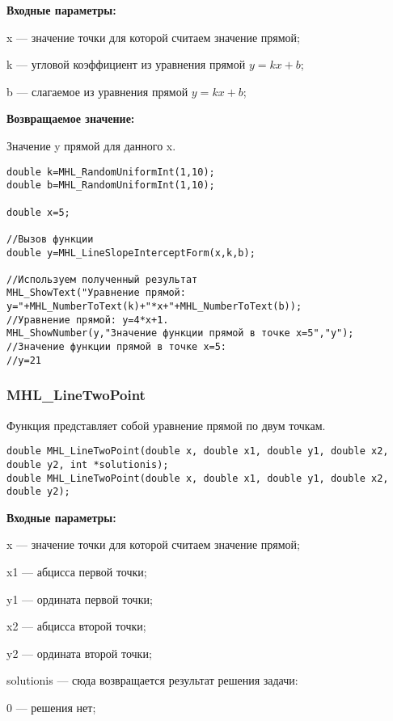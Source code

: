 \documentclass[a4paper,12pt]{article}
\begin{document}
\textbf{Входные параметры:}  
 
x --- значение точки для которой считаем значение прямой;
 
k --- угловой коэффициент из уравнения прямой $y=kx+b$;
 
b --- слагаемое из уравнения прямой $y=kx+b$; 

\textbf{Возвращаемое значение:}

Значение y прямой для данного x.


\begin{lstlisting}[label=code_use_MHL_LineSlopeInterceptForm,caption=Пример использования]
double k=MHL_RandomUniformInt(1,10);
double b=MHL_RandomUniformInt(1,10);

double x=5;

//Вызов функции
double y=MHL_LineSlopeInterceptForm(x,k,b);

//Используем полученный результат
MHL_ShowText("Уравнение прямой: y="+MHL_NumberToText(k)+"*x+"+MHL_NumberToText(b));
//Уравнение прямой: y=4*x+1.
MHL_ShowNumber(y,"Значение функции прямой в точке x=5","y");
//Значение функции прямой в точке x=5:
//y=21
\end{lstlisting}

\subsubsection{MHL\_LineTwoPoint}\label{MHL_LineTwoPoint}

Функция представляет собой уравнение прямой по двум точкам.


\begin{lstlisting}[label=code_syntax_MHL_LineTwoPoint,caption=Синтаксис]
double MHL_LineTwoPoint(double x, double x1, double y1, double x2, double y2, int *solutionis);
double MHL_LineTwoPoint(double x, double x1, double y1, double x2, double y2);
\end{lstlisting}

\textbf{Входные параметры:}  

x --- значение точки для которой считаем значение прямой;
 
x1 --- абцисса первой точки;
 
y1 --- ордината первой точки;
 
x2 --- абцисса второй точки;
 
y2 --- ордината второй точки;
 
solutionis --- сюда возвращается результат решения задачи:
 
 0 --- решения нет;
 
\end{document}

